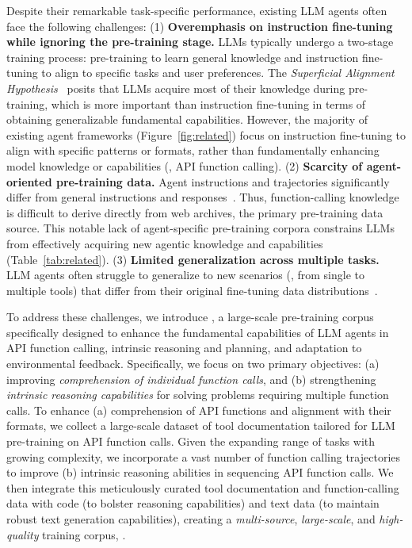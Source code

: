 Despite their remarkable task-specific performance, existing LLM agents often face the following challenges: 
(1) \textbf{Overemphasis on instruction fine-tuning while ignoring the pre-training stage.} LLMs typically undergo a two-stage training process: pre-training to learn general knowledge and instruction fine-tuning to align to specific tasks and user preferences.
The \emph{Superficial Alignment Hypothesis}~\citep{zhou2024lima, gudibande2024the, lin2024the} posits that LLMs acquire most of their knowledge during pre-training, which is more important than instruction fine-tuning in terms of obtaining generalizable fundamental capabilities. 
However, the majority of existing agent frameworks (Figure~\ref{fig:related}) focus on instruction fine-tuning to align with specific patterns or formats, rather than fundamentally enhancing model knowledge or capabilities (\eg, API function calling).
(2) \textbf{Scarcity of agent-oriented pre-training data.} 
Agent instructions and trajectories significantly differ from general instructions and responses~\cite{zhang2024xlam}. Thus, function-calling knowledge is difficult to derive directly from web archives, the primary pre-training data source.
This notable lack of agent-specific pre-training corpora constrains LLMs from effectively acquiring new agentic knowledge and capabilities (Table~\ref{tab:related}).
(3) \textbf{Limited generalization across multiple tasks.}
LLM agents often struggle to generalize to new scenarios (\eg, from single to multiple tools) that differ from their original fine-tuning data distributions~\cite{qin2023toolllm}. 

To address these challenges, we introduce \dataset, a large-scale pre-training corpus specifically designed to enhance the fundamental capabilities of LLM agents in API function calling, intrinsic reasoning and planning, and adaptation to environmental feedback. 
Specifically, we focus on two primary objectives: (a) improving \emph{comprehension of individual function calls}, and (b) strengthening \emph{intrinsic reasoning capabilities} for solving problems requiring multiple function calls. 
To enhance (a) comprehension of API functions and alignment with their formats, we collect a large-scale dataset of tool documentation tailored for LLM pre-training on API function calls. 
Given the expanding range of tasks with growing complexity, we incorporate a vast number of function calling trajectories to improve (b) intrinsic reasoning abilities in sequencing API function calls. 
We then integrate this meticulously curated tool documentation and function-calling data with code (to bolster reasoning capabilities) and text data (to maintain robust text generation capabilities), creating a \emph{multi-source}, \emph{large-scale}, and \emph{high-quality} training corpus, \dataset.

